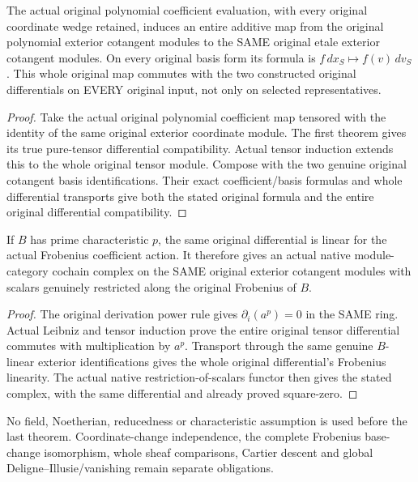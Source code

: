 \begin{theorem}
\label{lem:cartier-etale-polynomial-differential-map}
\leanok
The actual original polynomial coefficient evaluation, with every original
coordinate wedge retained, induces an entire additive map from the original
polynomial exterior cotangent modules to the SAME original etale exterior
cotangent modules. On every original basis form its formula is
$f\,dx_S\mapsto f(v)\,d v_S$.
This whole original map commutes with the two constructed original differentials
on EVERY original input, not only on selected representatives.
\end{theorem}
\begin{proof}
Take the actual original polynomial coefficient map tensored with the identity
of the same original exterior coordinate module. The first theorem gives its
true pure-tensor differential compatibility. Actual tensor induction extends
this to the whole original tensor module. Compose with the two genuine original
cotangent basis identifications. Their exact coefficient/basis formulas and
whole differential transports give both the stated original formula and the
entire original differential compatibility.
\end{proof}

\begin{theorem}
\label{lem:cartier-etale-frobenius-complex}
\leanok
If $B$ has prime characteristic $p$, the same original differential is linear
for the actual Frobenius coefficient action. It therefore gives an actual native
module-category cochain complex on the SAME original exterior cotangent modules
with scalars genuinely restricted along the original Frobenius of $B$.
\end{theorem}
\begin{proof}
The original derivation power rule gives $\partial_i(a^p)=0$ in the SAME ring.
Actual Leibniz and tensor induction prove the entire original tensor differential
commutes with multiplication by $a^p$. Transport through the same genuine
$B$-linear exterior identifications gives the whole original differential's
Frobenius linearity. The actual native restriction-of-scalars functor then gives
the stated complex, with the same differential and already proved square-zero.
\end{proof}

No field, Noetherian, reducedness or characteristic assumption is used before the
last theorem. Coordinate-change independence, the complete Frobenius base-change
isomorphism, whole sheaf comparisons, Cartier descent and global
Deligne--Illusie/vanishing remain separate obligations.

